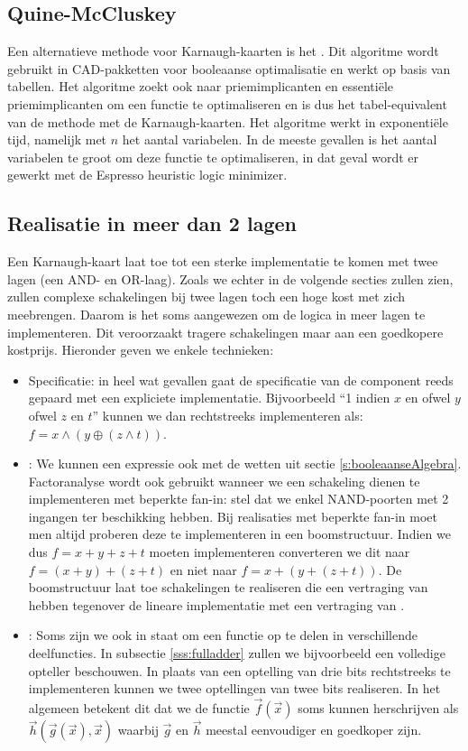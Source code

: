 \subsection{Quine-McCluskey}
Een alternatieve methode voor Karnaugh-kaarten is het . Dit algoritme wordt gebruikt in CAD-pakketten voor booleaanse optimalisatie en werkt op basis van tabellen. Het algoritme zoekt ook naar priemimplicanten en essenti\"ele priemimplicanten om een functie te optimaliseren en is dus het tabel-equivalent van de methode met de Karnaugh-kaarten. Het algoritme werkt in exponenti\"ele tijd, namelijk  met $n$ het aantal variabelen. In de meeste gevallen is het aantal variabelen te groot om deze functie te optimaliseren, in dat geval wordt er gewerkt met de Espresso heuristic logic minimizer.
\subsection{Realisatie in meer dan 2 lagen}
Een Karnaugh-kaart laat toe tot een sterke implementatie te komen met twee lagen (een AND- en OR-laag). Zoals we echter in de volgende secties zullen zien, zullen complexe schakelingen bij twee lagen toch een hoge kost met zich meebrengen. Daarom is het soms aangewezen om de logica in meer lagen te implementeren. Dit veroorzaakt tragere schakelingen maar aan een goedkopere kostprijs. Hieronder geven we enkele technieken:
\begin{itemize}
 \item Specificatie: in heel wat gevallen gaat de specificatie van de component reeds gepaard met een expliciete implementatie. Bijvoorbeeld ``1 indien $x$ en ofwel $y$ ofwel $z$ en $t$'' kunnen we dan rechtstreeks implementeren als: $f=x\wedge\left(y\oplus\left(z\wedge t\right)\right)$.
 \item {}: We kunnen een expressie ook  met de wetten uit sectie \ref{s:booleaanseAlgebra}. Factoranalyse wordt ook gebruikt wanneer we een schakeling dienen te implementeren met beperkte fan-in: stel dat we enkel NAND-poorten met 2 ingangen ter beschikking hebben. Bij realisaties met beperkte fan-in moet men altijd proberen deze te implementeren in een boomstructuur. Indien we dus $f=x+y+z+t$ moeten implementeren converteren we dit naar $f=\left(x+y\right)+\left(z+t\right)$ en niet naar $f=x+\left(y+\left(z+t\right)\right)$. De boomstructuur laat toe schakelingen te realiseren die een vertraging van  hebben tegenover de lineare implementatie met een vertraging van .
 \item {}: Soms zijn we ook in staat om een functie op te delen in verschillende deelfuncties. In subsectie \ref{sss:fulladder} zullen we bijvoorbeeld een volledige opteller beschouwen. In plaats van een optelling van drie bits rechtstreeks te implementeren kunnen we twee optellingen van twee bits realiseren. In het algemeen betekent dit dat we de functie $\vec{f}\left(\vec{x}\right)$ soms kunnen herschrijven als $\vec{h}\left(\vec{g}\left(\vec{x}\right),\vec{x}\right)$ waarbij $\vec{g}$ en $\vec{h}$ meestal eenvoudiger en goedkoper zijn.
\end{itemize}
